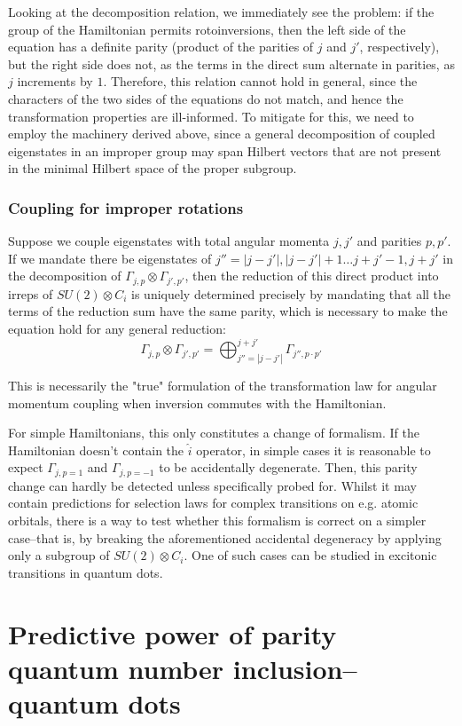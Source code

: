 \documentclass[12pt]{article}
\begin{document}
	Looking at the decomposition relation, we immediately see the problem: if the group of the Hamiltonian permits rotoinversions, then the left side of the equation has a definite parity (product of the parities of $j$ and $j'$, respectively), but the right side does not, as the terms in the direct sum alternate in parities, as $j$ increments by $1$. Therefore, this relation cannot hold in general, since the characters of the two sides of the equations do not match, and hence the transformation properties are ill-informed. To mitigate for this, we need to employ the machinery derived above, since a general decomposition of coupled eigenstates in an improper group may span Hilbert vectors that are not present in the minimal Hilbert space of the proper subgroup.
	
	\subsubsection{Coupling for improper rotations}
	
	Suppose we couple eigenstates with total angular momenta $j,j'$ and parities $p,p'$. If we mandate there be eigenstates of $j''=|j-j'|, |j-j'|+1\dots j+j'-1, j+j'$ in the decomposition of $\Gamma_{j,p}\otimes\Gamma_{j',p'}$, then the reduction of this direct product into irreps of $SU(2)\otimes C_i$ is uniquely determined precisely by mandating that all the terms of the reduction sum have the same parity, which is necessary to make the equation hold for any general reduction:
	$$\Gamma_{j,p}\otimes\Gamma_{j',p'}=\bigoplus_{j''=|j-j'|}^{j+j'}\Gamma_{j'',p\cdot p'}$$
	
	This is necessarily the "true" formulation of the transformation law for angular momentum coupling when inversion commutes with the Hamiltonian.
	
	For simple Hamiltonians, this only constitutes a change of formalism. If the Hamiltonian doesn't contain the $\hat{i}$ operator, in simple cases it is reasonable to expect $\Gamma_{j,p=1}$ and $\Gamma_{j,p=-1}$ to be accidentally degenerate. Then, this parity change can hardly be detected unless specifically probed for. Whilst it may contain predictions for selection laws for complex transitions on e.g. atomic orbitals, there is a way to test whether this formalism is correct on a simpler case--that is, by breaking the aforementioned accidental degeneracy by applying only a subgroup of $SU(2)\otimes C_i$. One of such cases can be studied in excitonic transitions in quantum dots.
	
	
	\section{Predictive power of parity quantum number inclusion--quantum dots}\label{accidental_breakage}
	
\end{document}
